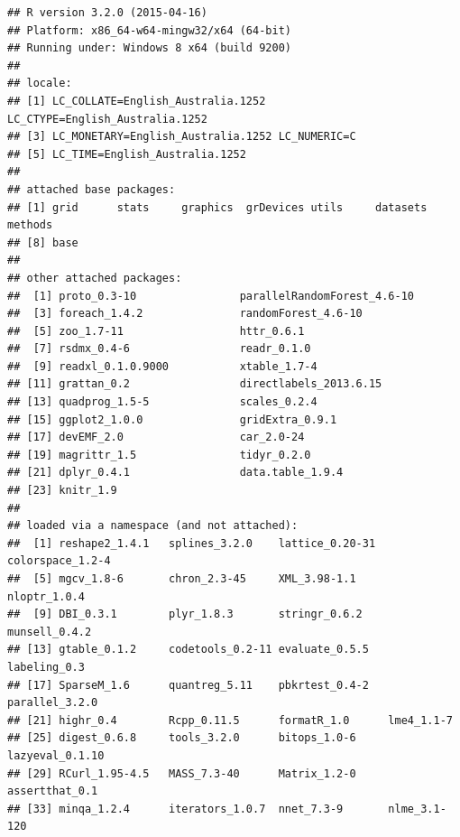 \documentclass{grattan}\usepackage[]{graphicx}\usepackage[]{color}
\makeatletter
\newenvironment{kframe}{%
 \def\at@end@of@kframe{}%
 \ifinner\ifhmode%
  \def\at@end@of@kframe{\end{minipage}}%
  \begin{minipage}{\columnwidth}%
 \fi\fi%
 \def\FrameCommand##1{\hskip\@totalleftmargin \hskip-\fboxsep
 \colorbox{shadecolor}{##1}\hskip-\fboxsep
     \hskip-\linewidth \hskip-\@totalleftmargin \hskip\columnwidth}%
 \MakeFramed {\advance\hsize-\width
   \@totalleftmargin\z@ \linewidth\hsize
   \@setminipage}}%
 {\par\unskip\endMakeFramed%
 \at@end@of@kframe}
\newenvironment{knitrout}{}{} %
\makeatother
\begin{document}

\begin{knitrout}
\color{fgcolor}\begin{kframe}
\begin{verbatim}
## R version 3.2.0 (2015-04-16)
## Platform: x86_64-w64-mingw32/x64 (64-bit)
## Running under: Windows 8 x64 (build 9200)
## 
## locale:
## [1] LC_COLLATE=English_Australia.1252  LC_CTYPE=English_Australia.1252   
## [3] LC_MONETARY=English_Australia.1252 LC_NUMERIC=C                      
## [5] LC_TIME=English_Australia.1252    
## 
## attached base packages:
## [1] grid      stats     graphics  grDevices utils     datasets  methods  
## [8] base     
## 
## other attached packages:
##  [1] proto_0.3-10                parallelRandomForest_4.6-10
##  [3] foreach_1.4.2               randomForest_4.6-10        
##  [5] zoo_1.7-11                  httr_0.6.1                 
##  [7] rsdmx_0.4-6                 readr_0.1.0                
##  [9] readxl_0.1.0.9000           xtable_1.7-4               
## [11] grattan_0.2                 directlabels_2013.6.15     
## [13] quadprog_1.5-5              scales_0.2.4               
## [15] ggplot2_1.0.0               gridExtra_0.9.1            
## [17] devEMF_2.0                  car_2.0-24                 
## [19] magrittr_1.5                tidyr_0.2.0                
## [21] dplyr_0.4.1                 data.table_1.9.4           
## [23] knitr_1.9                  
## 
## loaded via a namespace (and not attached):
##  [1] reshape2_1.4.1   splines_3.2.0    lattice_0.20-31  colorspace_1.2-4
##  [5] mgcv_1.8-6       chron_2.3-45     XML_3.98-1.1     nloptr_1.0.4    
##  [9] DBI_0.3.1        plyr_1.8.3       stringr_0.6.2    munsell_0.4.2   
## [13] gtable_0.1.2     codetools_0.2-11 evaluate_0.5.5   labeling_0.3    
## [17] SparseM_1.6      quantreg_5.11    pbkrtest_0.4-2   parallel_3.2.0  
## [21] highr_0.4        Rcpp_0.11.5      formatR_1.0      lme4_1.1-7      
## [25] digest_0.6.8     tools_3.2.0      bitops_1.0-6     lazyeval_0.1.10 
## [29] RCurl_1.95-4.5   MASS_7.3-40      Matrix_1.2-0     assertthat_0.1  
## [33] minqa_1.2.4      iterators_1.0.7  nnet_7.3-9       nlme_3.1-120
\end{verbatim}
\end{kframe}
\end{knitrout}
\twocolumn

\printbibliography
\end{document}
